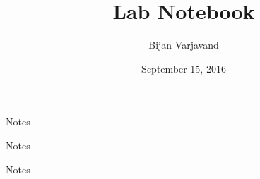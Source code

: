 \documentclass{article}
\author{Bijan Varjavand}
\title{Lab Notebook}
\date{September 15, 2016}
\begin{document}
\maketitle

Notes

Notes

Notes
\end{document}
